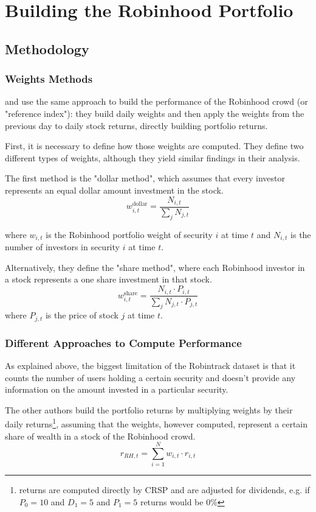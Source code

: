 \section{Building the Robinhood Portfolio}
\subsection{Methodology}
\subsubsection{Weights Methods} 
\cite{Fedyk2024} and \cite{Welch2022} use the same approach to build the performance of the Robinhood crowd (or "reference index"): 
they build daily weights and then apply the weights from the previous day to daily stock returns, directly building portfolio returns. 

First, it is necessary to define how those weights are computed. They define two different types of weights, although they yield similar findings in their analysis.

The first method is the "dollar method", which assumes that every investor represents an equal dollar amount investment in the stock. 
\begin{equation}
    w^{\text{dollar}}_{i,t} = \frac{N_{i,t}}{\sum_j N_{j,t}}
\end{equation}

where $w_{i,t}$ is the Robinhood portfolio weight of security $i$ at time $t$ and $N_{i,t}$ is the number of investors in security $i$ at time $t$.

Alternatively, they define the "share method", where each Robinhood investor in a stock represents a one share investment in that stock.
\begin{equation}
    w^{\text{share}}_{i,t} = \frac{N_{i,t}\cdot P_{i,t}}{\sum_j N_{j,t}\cdot P_{j,t}}
\end{equation}
where $P_{j,t}$ is the price of stock $j$ at time $t$.

\subsubsection{Different Approaches to Compute Performance}
As explained above, the biggest limitation of the Robintrack dataset is that it counts the number of users holding a certain security and doesn't provide any information on the amount invested in a particular security. 

The other authors build the portfolio returns by multiplying weights by their daily returns\footnote{returns are computed directly by CRSP and are adjusted for dividends, e.g. if $P_0=10$ and $D_1=5$ and $P_1=5$ returns would be 0\%}, 
assuming that the weights, however computed, represent a certain share of wealth in a stock of the Robinhood crowd.
\begin{equation}
    r_{RH,t} = \sum_{i=1}^N w_{i,t}\cdot r_{i,t}
    \label{returns_fedyk}
\end{equation}

